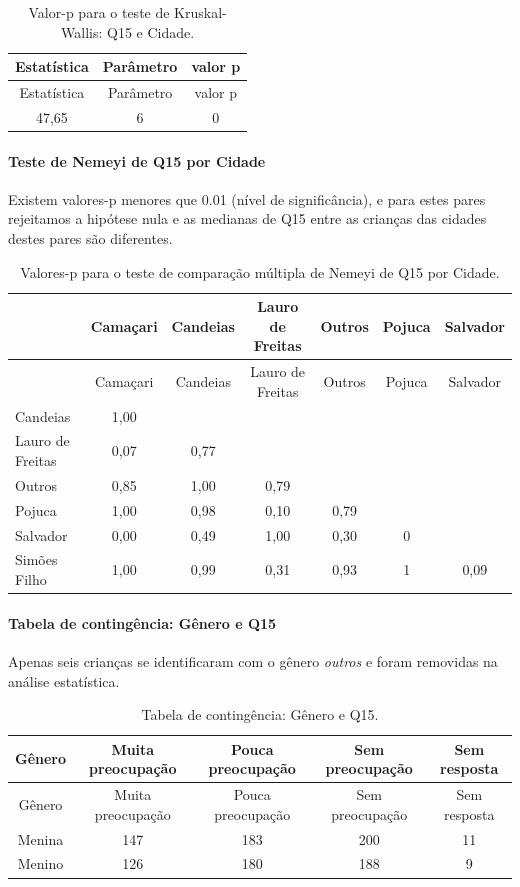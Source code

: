\documentclass[]{article}
\let\oldparagraph\paragraph
\renewcommand{\paragraph}[1]{\oldparagraph{#1}\mbox{}}
\begin{document}
\begin{longtable}[]{@{}ccc@{}}
\caption{\label{tab:unnamed-chunk-78}Valor-p para o teste de Kruskal-Wallis: Q15 e Cidade.}\tabularnewline
\toprule
Estatística & Parâmetro & valor p\tabularnewline
\midrule
\endfirsthead
\toprule
Estatística & Parâmetro & valor p\tabularnewline
\midrule
\endhead
47,65 & 6 & 0\tabularnewline
\bottomrule
\end{longtable}

\hypertarget{teste-de-nemeyi-de-q15-por-cidade}{%
\paragraph{Teste de Nemeyi de Q15 por Cidade}\label{teste-de-nemeyi-de-q15-por-cidade}}

Existem valores-p menores que 0.01 (nível de significância), e para estes pares rejeitamos a hipótese nula e as medianas de Q15 entre as crianças das cidades destes pares são diferentes.

\begin{longtable}[]{@{}lcccccc@{}}
\caption{\label{tab:unnamed-chunk-80}Valores-p para o teste de comparação múltipla de Nemeyi de Q15 por Cidade.}\tabularnewline
\toprule
& Camaçari & Candeias & Lauro de Freitas & Outros & Pojuca & Salvador\tabularnewline
\midrule
\endfirsthead
\toprule
& Camaçari & Candeias & Lauro de Freitas & Outros & Pojuca & Salvador\tabularnewline
\midrule
\endhead
Candeias & 1,00 & & & & &\tabularnewline
Lauro de Freitas & 0,07 & 0,77 & & & &\tabularnewline
Outros & 0,85 & 1,00 & 0,79 & & &\tabularnewline
Pojuca & 1,00 & 0,98 & 0,10 & 0,79 & &\tabularnewline
Salvador & 0,00 & 0,49 & 1,00 & 0,30 & 0 &\tabularnewline
Simões Filho & 1,00 & 0,99 & 0,31 & 0,93 & 1 & 0,09\tabularnewline
\bottomrule
\end{longtable}

\cleardoublepage

\hypertarget{tabela-de-continguxeancia-guxeanero-e-q15}{%
\paragraph{Tabela de contingência: Gênero e Q15}\label{tabela-de-continguxeancia-guxeanero-e-q15}}

Apenas seis crianças se identificaram com o gênero \emph{outros} e foram removidas na análise estatística.

\begin{longtable}[]{@{}ccccc@{}}
\caption{\label{tab:unnamed-chunk-81}Tabela de contingência: Gênero e Q15.}\tabularnewline
\toprule
Gênero & Muita preocupação & Pouca preocupação & Sem preocupação & Sem resposta\tabularnewline
\midrule
\endfirsthead
\toprule
Gênero & Muita preocupação & Pouca preocupação & Sem preocupação & Sem resposta\tabularnewline
\midrule
\endhead
Menina & 147 & 183 & 200 & 11\tabularnewline
Menino & 126 & 180 & 188 & 9\tabularnewline
\bottomrule
\end{longtable}
\end{document}
